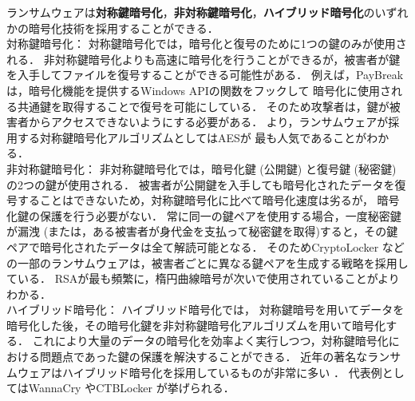 ランサムウェアは\textbf{対称鍵暗号化}，\textbf{非対称鍵暗号化}，\textbf{ハイブリッド暗号化}のいずれかの暗号化技術を採用することができる．
\\
対称鍵暗号化：
対称鍵暗号化では，暗号化と復号のために1つの鍵のみが使用される．
非対称鍵暗号化よりも高速に暗号化を行うことができるが，被害者が鍵を入手してファイルを復号することができる可能性がある．
例えば，PayBreak \cite{kolodenker2017paybreak} は，暗号化機能を提供するWindows APIの関数をフックして
暗号化に使用される共通鍵を取得することで復号を可能にしている．
そのため攻撃者は，鍵が被害者からアクセスできないようにする必要がある．
より，ランサムウェアが採用する対称鍵暗号化アルゴリズムとしてはAESが
最も人気であることがわかる．
\\
非対称鍵暗号化：
非対称鍵暗号化では，暗号化鍵 (公開鍵) と復号鍵 (秘密鍵) の2つの鍵が使用される．
被害者が公開鍵を入手しても暗号化されたデータを復号することはできないため，対称鍵暗号化に比べて暗号化速度は劣るが，
暗号化鍵の保護を行う必要がない．
常に同一の鍵ペアを使用する場合，一度秘密鍵が漏洩 (または，ある被害者が身代金を支払って秘密鍵を取得)すると，その鍵ペアで暗号化されたデータは全て解読可能となる．
そのためCryptoLocker \cite{liao2016behind}などの一部のランサムウェアは，被害者ごとに異なる鍵ペアを生成する戦略を採用している．
RSAが最も頻繁に，楕円曲線暗号が次いで使用されていることがよりわかる．
\\
ハイブリッド暗号化：
ハイブリッド暗号化では，
対称鍵暗号を用いてデータを暗号化した後，その暗号化鍵を非対称鍵暗号化アルゴリズムを用いて暗号化する．
これにより大量のデータの暗号化を効率よく実行しつつ，対称鍵暗号化における問題点であった鍵の保護を解決することができる．
近年の著名なランサムウェアはハイブリッド暗号化を採用しているものが非常に多い \cite{begovic2023cryptographic}．
代表例としてはWannaCry \cite{WannaCry} やCTBLocker \cite{ctb-locker} が挙げられる．




